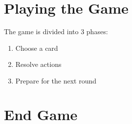 \documentclass[12pt]{article}
\newenvironment{enumerateCustom}
{\begin{enumerate}
  \setlength{\itemsep}{1pt}
  \setlength{\parskip}{0pt}
  \setlength{\parsep}{0pt}}
{\end{enumerate}}
\begin{document}
\begin{mdframed}[style = customFrame]
\begin{multicols*}{2}
\section*{Playing the Game}
The game is divided into 3 phases:
\begin{enumerateCustom}
	\item Choose a card
	\item Resolve actions
	\item Prepare for the next round
\end{enumerateCustom}

\section*{End Game}

\end{multicols*}
\end{mdframed}
\end{document}
